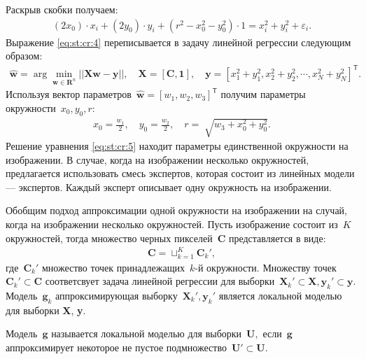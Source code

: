 Раскрыв скобки получаем:
\[
\label{eq:st:cr:4}
\begin{aligned}
\left(2x_0\right)\cdot x_i + \left(2y_0\right)\cdot y_i+\left(r^2-x_0^2-y_0^2\right)\cdot1 = x_{i}^2 + y_{i}^2 + \varepsilon_i.
\end{aligned}
\]
Выражение \eqref{eq:st:cr:4} переписывается в задачу линейной регрессии следующим образом:
\[
\label{eq:st:cr:5}
\begin{aligned}
\hat{\textbf{w}} = \arg\min_{\textbf{w}\in \mathbf{R}^{n}}||\textbf{X}\textbf{w} - \textbf{y}||,  \quad \textbf{X} = \left[\textbf{C}, \textbf{1}\right], \quad \textbf{y} = \left[x_1^2+y_1^2, x_2^2+y_2^2, \cdots, x_N^2+y_N^2\right]^{\mathsf{T}}.
\end{aligned}
\]
Используя вектор параметров~$\hat{\textbf{w}} = \left[w_1, w_2, w_3\right]^{\mathsf{T}}$ получим параметры окружности~$x_0, y_0, r$:
\[
\label{eq:st:cr:6}
\begin{aligned}
x_0 = \frac{w_1}{2}, \quad y_0 = \frac{w_2}{2}, \quad r = \sqrt[]{w_3+x_{0}^{2}+y_{0}^{2}}.
\end{aligned}
\]
Решение уравнения \eqref{eq:st:cr:5} находит параметры единственной окружности на изображении. В случае, когда на изображении несколько окружностей, предлагается использовать смесь экспертов, которая состоит из линейных модели --- экспертов. Каждый эксперт описывает одну окружность на изображении.

Обобщим подход аппроксимации одной окружности на изображении на случай, когда на изображении несколько окружностей. Пусть изображение состоит из~$K$ окружностей, тогда множество черных пикселей~$\textbf{C}$ представляется в виде:
\[
\label{eq:st:1}
\begin{aligned}
\textbf{C} = \sqcup_{k=1}^{K}\textbf{C}_{k}',
\end{aligned}
\]
где~$\textbf{C}_{k}'$ множество точек принадлежащих~$k$-й окружности. Множеству точек~$\textbf{C}_{k}' \subset\textbf{C}$ соответсвует задача линейной регрессии для выборки~$\textbf{X}_{k}' \subset \textbf{X}, \textbf{y}_{k}' \subset \textbf{y}$. Модель~$\mathbf{g}_k$ аппроксимирующая выборку~$\textbf{X}_{k}', \textbf{y}_{k}'$ является локальной моделью для выборки \textbf{X}, \textbf{y}.


\begin{definition}
\label{def:1}
Модель~$\mathbf{g}$ называется локальной моделью для выборки~$\textbf{U},$ если~$\mathbf{g}$ аппроксимирует некоторое не пустое подмножество~$\textbf{U}'\subset\textbf{U}$.
\end{definition}

